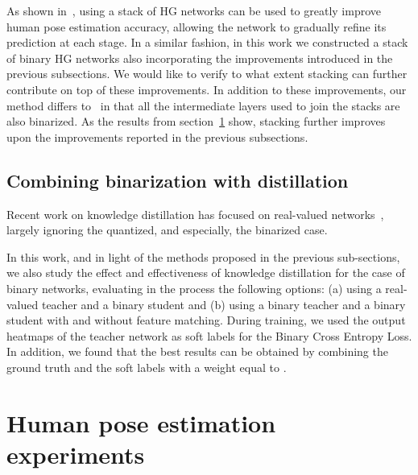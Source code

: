 \documentclass[10pt,twocolumn,letterpaper]{article}
\begin{document}
As shown in~\cite{newell2016stacked}, using a stack of HG networks can be used to greatly improve human pose estimation accuracy, allowing the network to gradually refine its prediction at each stage. In a similar fashion, in this work we constructed a stack of binary HG networks also incorporating the improvements introduced in the previous subsections. We would like to verify to what extent stacking can further contribute on top of these improvements. In addition to these improvements, our method differs to~\cite{bulat2018hierarchical} in that all the intermediate layers used to join the stacks are also binarized. As the results from section~\ref{sec:results-human-pose} show, stacking further improves upon the improvements reported in the previous subsections.


















\subsection{Combining binarization with distillation}\label{sec:distilled-binary-nets}

Recent work on knowledge distillation has focused on real-valued networks~\cite{hinton2015distilling}, largely ignoring the quantized, and especially, the binarized case. 

In this work, and in light of the methods proposed in the previous sub-sections, we also study the effect and effectiveness of knowledge distillation for the case of binary networks, evaluating in the process the following options: (a) using a real-valued teacher and a binary student and (b) using a binary teacher and a binary student with and without feature matching. During training, we used the output heatmaps of the teacher network as soft labels for the Binary Cross Entropy Loss. In addition, we found that the best results can be obtained by combining the ground truth and the soft labels with a weight equal to . 





\section{Human pose estimation experiments}\label{sec:results-human-pose}
\end{document}
